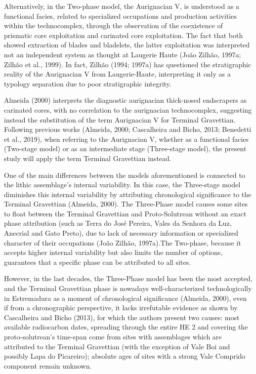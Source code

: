 \documentclass[12pt,twoside]{reedthesis}
\begin{document}
Alternatively, in the Two-phase model, the Aurignacian V, is understood as a functional facies, related to specialized occupations and production activities within the technocomplex, through the observation of the coexistence of prismatic core exploitation and carinated core exploitation. The fact that both showed extraction of blades and bladelets, the latter exploitation was interpreted not an independent system as thought at Laugerie Haute (João Zilhão, 1997a; Zilhão et al., 1999). In fact, Zilhão (1994; 1997a) has questioned the stratigraphic reality of the Aurignacian V from Laugerie-Haute, interpreting it only as a typology separation due to poor stratigraphic integrity.

Almeida (2000) interprets the diagnostic aurignacian thick-nosed endscrapers as carinated cores, with no correlation to the aurignacian technocomplex, suggesting instead the substitution of the term Aurignacian V for Terminal Gravettian. Following previous works (Almeida, 2000; Cascalheira and Bicho, 2013; Benedetti et al., 2019), when referring to the Aurignacian V, whether as a functional facies (Two-stage model) or as an intermediate stage (Three-stage model), the present study will apply the term Terminal Gravettian instead.

One of the main differences between the models aforementioned is connected to the lithic assemblage's internal variability. In this case, the Three-stage model diminishes this internal variability by attributing chronological significance to the Terminal Gravettian (Almeida, 2000). The Three-Phase model causes some sites to float between the Terminal Gravettian and Proto-Solutrean without an exact phase attribution (such as Terra do José Pereira, Vales da Senhora da Luz, Anecrial and Gato Preto), due to lack of necessary information or specialized character of their occupations (João Zilhão, 1997a).The Two-phase, because it accepts higher internal variability but also limits the number of options, guarantees that a specific phase can be attributed to all sites.

However, in the last decades, the Three-Phase model has been the most accepted, and the Terminal Gravettian phase is nowadays well-characterized technologically in Estremadura as a moment of chronological significance (Almeida, 2000), even if from a chronographic perspective, it lacks irrefutable evidence as shown by Cascalheira and Bicho (2013), for which the authors present two causes: most available radiocarbon dates, spreading through the entire HE 2 and covering the proto-solutrean's time-span come from sites with assemblages which are attributed to the Terminal Gravettian (with the exception of Vale Boi and possibly Lapa do Picareiro); absolute ages of sites with a strong Vale Comprido component remain unknown.
\end{document}
